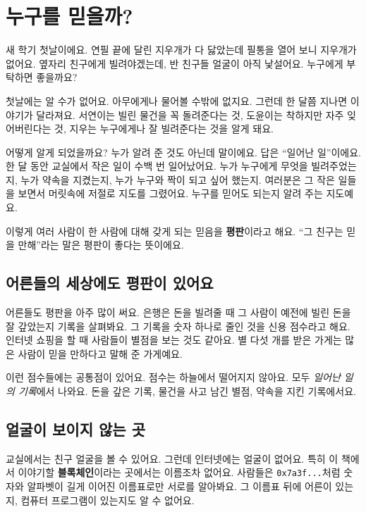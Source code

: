 \chapter{누구를 믿을까?}

새 학기 첫날이에요.
연필 끝에 달린 지우개가 다 닳았는데 필통을 열어 보니 지우개가 없어요.
옆자리 친구에게 빌려야겠는데, 반 친구들 얼굴이 아직 낯설어요.
누구에게 부탁하면 좋을까요?

첫날에는 알 수가 없어요.
아무에게나 물어볼 수밖에 없지요.
그런데 한 달쯤 지나면 이야기가 달라져요.
서연이는 빌린 물건을 꼭 돌려준다는 것,
도윤이는 착하지만 자주 잊어버린다는 것,
지우는 누구에게나 잘 빌려준다는 것을 알게 돼요.

어떻게 알게 되었을까요?
누가 알려 준 것도 아닌데 말이에요.
답은 “일어난 일”이에요.
한 달 동안 교실에서 작은 일이 수백 번 일어났어요.
누가 누구에게 무엇을 빌려주었는지, 누가 약속을 지켰는지, 누가 누구와 짝이 되고 싶어 했는지.
여러분은 그 작은 일들을 보면서 머릿속에 저절로 지도를 그렸어요.
누구를 믿어도 되는지 알려 주는 지도예요.

이렇게 여러 사람이 한 사람에 대해 갖게 되는 믿음을 \textbf{평판}이라고 해요.
“그 친구는 믿을 만해”라는 말은 평판이 좋다는 뜻이에요.

\section{어른들의 세상에도 평판이 있어요}

어른들도 평판을 아주 많이 써요.
은행은 돈을 빌려줄 때 그 사람이 예전에 빌린 돈을 잘 갚았는지 기록을 살펴봐요.
그 기록을 숫자 하나로 줄인 것을 신용 점수라고 해요.
인터넷 쇼핑을 할 때 사람들이 별점을 보는 것도 같아요.
별 다섯 개를 받은 가게는 많은 사람이 믿을 만하다고 말해 준 가게예요.

이런 점수들에는 공통점이 있어요.
점수는 하늘에서 떨어지지 않아요.
모두 \emph{일어난 일의 기록}에서 나와요.
돈을 갚은 기록, 물건을 사고 남긴 별점, 약속을 지킨 기록에서요.

\section{얼굴이 보이지 않는 곳}

교실에서는 친구 얼굴을 볼 수 있어요.
그런데 인터넷에는 얼굴이 없어요.
특히 이 책에서 이야기할 \textbf{블록체인}이라는 곳에서는 이름조차 없어요.
사람들은 \texttt{0x7a3f...}처럼 숫자와 알파벳이 길게 이어진 이름표로만 서로를 알아봐요.
그 이름표 뒤에 어른이 있는지, 컴퓨터 프로그램이 있는지도 알 수 없어요.

